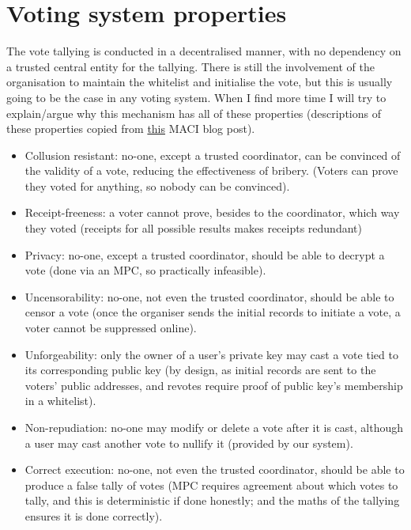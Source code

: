 \documentclass{article}
\begin{document}
\section{Voting system properties}
The vote tallying is conducted in a decentralised manner, with no dependency on a trusted central entity for the tallying. There is still the involvement of the organisation to maintain the whitelist and initialise the vote, but this is usually going to be the case in any voting system.
When I find more time I will try to explain/argue why this mechanism has all of these properties (descriptions of these properties copied from \hyperlink{https://medium.com/privacy-scaling-explorations/release-announcement-maci-1-0-c032bddd2157}{this} MACI blog post).
\begin{itemize}
    \item Collusion resistant: no-one, except a trusted coordinator, can be convinced of the validity of a vote, reducing the effectiveness of bribery. (Voters can prove they voted for anything, so nobody can be convinced).
    \item Receipt-freeness: a voter cannot prove, besides to the coordinator, which way they voted (receipts for all possible results makes receipts redundant)
    \item Privacy: no-one, except a trusted coordinator, should be able to decrypt a vote (done via an MPC, so practically infeasible).
    \item Uncensorability: no-one, not even the trusted coordinator, should be able to censor a vote (once the organiser sends the initial records to initiate a vote, a voter cannot be suppressed online).
    \item Unforgeability: only the owner of a user’s private key may cast a vote tied to its corresponding public key (by design, as initial records are sent to the voters' public addresses, and revotes require proof of public key's membership in a whitelist).
    \item Non-repudiation: no-one may modify or delete a vote after it is cast, although a user may cast another vote to nullify it (provided by our system).
    \item Correct execution: no-one, not even the trusted coordinator, should be able to produce a false tally of votes (MPC requires agreement about which votes to tally, and this is deterministic if done honestly; and the maths of the tallying ensures it is done correctly).
\end{itemize}
\end{document}
